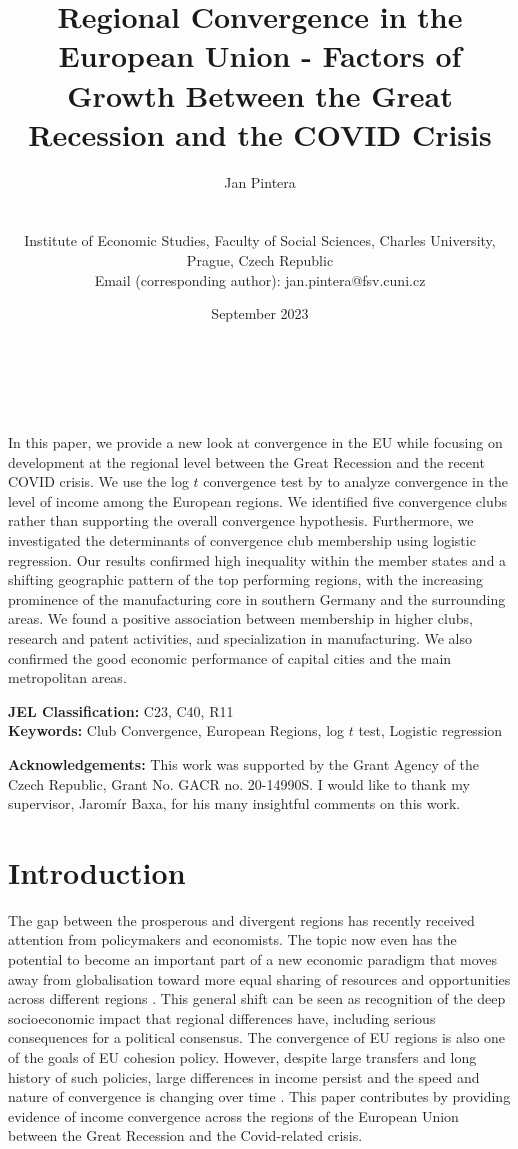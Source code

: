 \documentclass[11pt]{article}
\title{Regional Convergence in the European Union - Factors of Growth Between the Great Recession and the COVID Crisis}
\author{
        \begin{large}Jan Pintera\end{large} \\\vspace{5mm} \begin{small} Institute of Economic Studies, Faculty of Social Sciences, Charles University,\\ Prague, Czech Republic\\
        Email (corresponding author): jan.pintera@fsv.cuni.cz 
        \end{small}
}
\date{September 2023}
\makeatletter
\renewcommand{\maketitle}{\bgroup\setlength{\parindent}{0pt}
\begin{flushright}
  \textbf{\@title}\\
  \vspace{5mm}
  \@author\\
  \vspace{5mm}
  \@date
\end{flushright}\egroup
}
\renewenvironment{abstract}
 {\small
  \begin{flushleft}
  \bfseries \abstractname\vspace{-.5em}\vspace{0pt}
  \end{flushleft}
  \list{}{%
    \setlength{\leftmargin}{0mm}%
    \setlength{\rightmargin}{\leftmargin}%
  }%
  \item\relax}
 {\endlist}
\def \Keywords {Club Convergence, European Regions, log $t$ test, Logistic regression}
\makeatother
\begin{document}
\maketitle


\thispagestyle{empty}
\begin{abstract}
In this paper, we provide a new look at convergence in the EU while focusing on development at the regional level between the Great Recession and the recent COVID crisis. We use the log $t$ convergence test by \citet{phillips2007transition} to analyze convergence in the level of income among the European regions. We identified five convergence clubs rather than supporting the overall convergence hypothesis. Furthermore, we investigated the determinants of convergence club membership using logistic regression. Our results confirmed high inequality within the member states and a shifting geographic pattern of the top performing regions, with the increasing prominence of the manufacturing core in southern Germany and the surrounding areas. We found a positive association between membership in higher clubs, research and patent activities, and specialization in manufacturing. We also confirmed the good economic performance of capital cities and the main metropolitan areas.

\bigskip


\textbf{JEL Classification:} C23, C40, R11 \\
\textbf{Keywords:}  \Keywords \\

\bigskip

\textbf{Acknowledgements:} This work was supported by the Grant Agency of the Czech Republic, Grant No. GACR no. 20-14990S. I would like to thank my supervisor, Jaromír Baxa, for his many insightful comments on this work.

\end{abstract}
\clearpage
\setcounter{page}{1}

\section{Introduction}
The gap between the prosperous and divergent regions has recently received attention from policymakers and economists. The topic now even has the potential to become an important part of a new economic paradigm that moves away from globalisation toward more equal sharing of resources and opportunities across different regions \citep{rodrik_2022}. This general shift can be seen as recognition of the deep socioeconomic impact that regional differences have, including serious consequences for a political consensus. The convergence of EU regions is also one of the goals of EU cohesion policy. However, despite large transfers and long history of such policies, large differences in income persist and the speed and nature of convergence is changing over time \citep{eckey2007convergence,zarotiadis2013european, iammarino2019regional}.
This paper contributes by providing evidence of income convergence across the regions of the European Union between the Great Recession and the Covid-related crisis.
\end{document}

